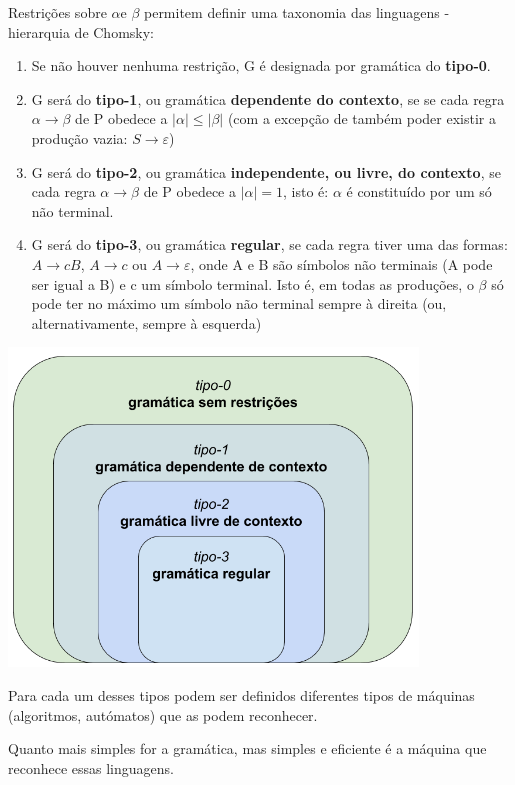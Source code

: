 \documentclass{article}
\begin{document}
\begin{flushleft}
  \item Restrições sobre $\alpha $e $\beta$ permitem definir uma taxonomia
  das linguagens - hierarquia de Chomsky:
  \begin{enumerate}
    \item Se não houver nenhuma restrição, G é designada por
    gramática do \textbf{tipo-0}.
    \item G será do \textbf{tipo-1}, ou gramática \textbf{dependente do contexto}, se
    se cada regra $\alpha \rightarrow \beta$ de P obedece a $| \alpha | \le | \beta |$ (com a
    excepção de também poder existir a produção vazia: $S \rightarrow \varepsilon$)
    \item G será do \textbf{tipo-2}, ou gramática \textbf{independente, ou livre, do
    contexto}, se cada regra $\alpha \rightarrow \beta$ de P obedece a $| \alpha | = 1$,
    isto é: $\alpha$ é constituído por um só não terminal.
    \item G será do \textbf{tipo-3}, ou gramática \textbf{regular}, se cada regra tiver
    uma das formas: $A \rightarrow c B$, $A \rightarrow c$ ou $A \rightarrow \varepsilon$, onde A e B
    são símbolos não terminais (A pode ser igual a B) e c um
    símbolo terminal. Isto é, em todas as produções, o $\beta$ só
    pode ter no máximo um símbolo não terminal sempre à
    direita (ou, alternativamente, sempre à esquerda)
  \end{enumerate}

  \begin{center}
    \includegraphics[scale=0.45]{14}
  \end{center}

  \item Para cada um desses tipos podem ser definidos diferentes
  tipos de máquinas (algoritmos, autómatos) que as podem
  reconhecer.
  \item Quanto mais simples for a gramática, mas simples e
  eficiente é a máquina que reconhece essas linguagens.
\end{flushleft}
\end{document}
